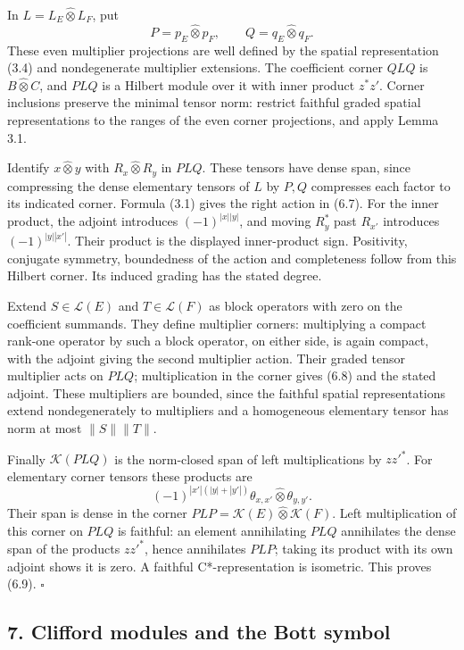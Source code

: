 \documentclass[
  11pt,
]{article}
\begin{document}
In \(L=L_E\widehat\otimes L_F\), put \[
P=p_E\widehat\otimes p_F,\qquad
Q=q_E\widehat\otimes q_F.
\] These even multiplier projections are well defined by the spatial
representation (3.4) and nondegenerate multiplier extensions. The
coefficient corner \(QLQ\) is \(B\widehat\otimes C\), and \(PLQ\) is a
Hilbert module over it with inner product \(z^*z'\). Corner inclusions
preserve the minimal tensor norm: restrict faithful graded spatial
representations to the ranges of the even corner projections, and apply
Lemma 3.1.

Identify \(x\widehat\otimes y\) with \(R_x\widehat\otimes R_y\) in
\(PLQ\). These tensors have dense span, since compressing the dense
elementary tensors of \(L\) by \(P,Q\) compresses each factor to its
indicated corner. Formula (3.1) gives the right action in (6.7). For the
inner product, the adjoint introduces \((-1)^{|x||y|}\), and moving
\(R_y^*\) past \(R_{x'}\) introduces \((-1)^{|y||x'|}\). Their product
is the displayed inner-product sign. Positivity, conjugate symmetry,
boundedness of the action and completeness follow from this Hilbert
corner. Its induced grading has the stated degree.

Extend \(S\in\mathcal L(E)\) and \(T\in\mathcal L(F)\) as block
operators with zero on the coefficient summands. They define multiplier
corners: multiplying a compact rank-one operator by such a block
operator, on either side, is again compact, with the adjoint giving the
second multiplier action. Their graded tensor multiplier acts on
\(PLQ\); multiplication in the corner gives (6.8) and the stated
adjoint. These multipliers are bounded, since the faithful spatial
representations extend nondegenerately to multipliers and a homogeneous
elementary tensor has norm at most \(\|S\|\|T\|\).

Finally \(\mathcal K(PLQ)\) is the norm-closed span of left
multiplications by \(zz'^*\). For elementary corner tensors these
products are \[
(-1)^{|x'|(|y|+|y'|)}
\theta_{x,x'}\widehat\otimes\theta_{y,y'}.
\] Their span is dense in the corner
\(PLP=\mathcal K(E)\widehat\otimes\mathcal K(F)\). Left multiplication
of this corner on \(PLQ\) is faithful: an element annihilating \(PLQ\)
annihilates the dense span of the products \(zz'^*\), hence annihilates
\(PLP\); taking its product with its own adjoint shows it is zero. A
faithful C*-representation is isometric. This proves (6.9). \(\square\)

\subsection{7. Clifford modules and the Bott
symbol}\label{clifford-modules-and-the-bott-symbol}
\end{document}
